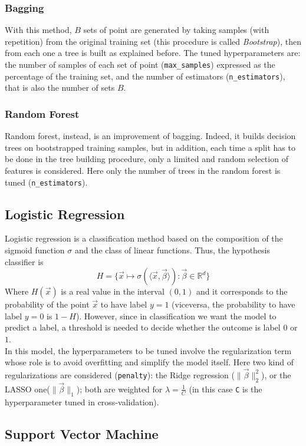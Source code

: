 \documentclass[letterpaper]{article}
\begin{document}
	\subsubsection{Bagging}
	With this method, $B$ sets of point are generated by taking samples (with repetition) from the original training set (this procedure is called \emph{Bootstrap}), then from each one a tree is built as explained before. The tuned hyperparameters are: the number of samples of each set of point (\texttt{max\_samples}) expressed as the percentage of the training set, and the number of estimators (\texttt{n\_estimators}), that is also the number of sets $B$.
	\subsubsection{Random Forest}
	Random forest, instead, is an improvement of bagging. Indeed, it builds decision trees on bootstrapped training samples, but in addition, each time a split has to be done in the tree building procedure, only a limited and random selection of features is considered. Here only the number of trees in the random forest is tuned (\texttt{n\_estimators}).
	\subsection{Logistic Regression}
	Logistic regression is a classification method based on the composition of the sigmoid function $\sigma$ and the class of linear functions. Thus, the hypothesis classifier is 
	\begin{equation}
		H = \{ \vec{x}\mapsto \sigma(\langle\vec{x},\vec{\beta}\rangle) : \vec{\beta}\in\mathbb{R}^d\}
	\end{equation}
	Where $H(\vec{x})$ is a real value in the interval $(0,1)$ and it corresponds to the probability of the point $\vec{x}$ to have label $y = 1$ (viceversa, the probability to have label $y=0$ is $1-H$). However, since in classification we want the model to predict a label, a threshold is needed to decide whether the outcome is label $0$ or $1$. \\
	In this model, the hyperparameters to be tuned involve the regularization term whose role is to avoid overfitting and simplify the model itself. Here two kind of regularizations are considered (\texttt{penalty}): the Ridge regression ($\lVert{\vec{\beta}}\rVert^2_2$), or the LASSO one($\lVert{\vec{\beta}}\rVert_1$); both are weighted for $\lambda = \frac{1}{C}$ (in this case \texttt{C} is the hyperparameter tuned in cross-validation).
	\subsection{Support Vector Machine}
	
\end{document}
